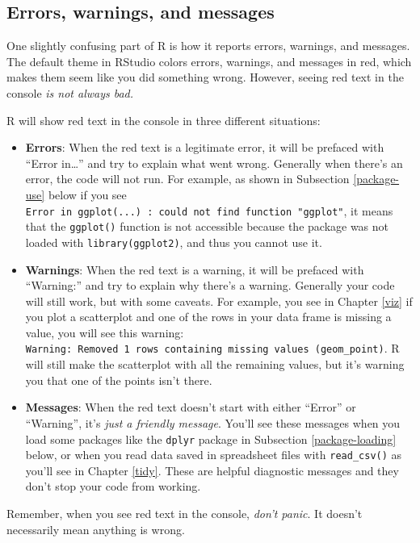 \documentclass[12pt, krantz2,]{krantz}
\providecommand{\tightlist}{%
  \setlength{\itemsep}{0pt}\setlength{\parskip}{0pt}}
\begin{document}
\hypertarget{errors-warnings-and-messages}{%
\subsection{Errors, warnings, and messages}\label{errors-warnings-and-messages}}

One slightly confusing part of R is how it reports errors, warnings, and messages. The default theme in RStudio colors errors, warnings, and messages in red, which makes them seem like you did something wrong. However, seeing red text in the console \emph{is not always bad.}

R will show red text in the console in three different situations:

\begin{itemize}
\tightlist
\item
  \textbf{Errors}: When the red text is a legitimate error, it will be prefaced with ``Error in\ldots{}'' and try to explain what went wrong. Generally when there's an error, the code will not run. For example, as shown in Subsection \ref{package-use} below if you see \texttt{Error\ in\ ggplot(...)\ :\ could\ not\ find\ function\ "ggplot"}, it means that the \texttt{ggplot()} function is not accessible because the package was not loaded with \texttt{library(ggplot2)}, and thus you cannot use it.
\item
  \textbf{Warnings}: When the red text is a warning, it will be prefaced with ``Warning:'' and try to explain why there's a warning. Generally your code will still work, but with some caveats. For example, you see in Chapter \ref{viz} if you plot a scatterplot and one of the rows in your data frame is missing a value, you will see this warning: \texttt{Warning:\ Removed\ 1\ rows\ containing\ missing\ values\ (geom\_point)}. R will still make the scatterplot with all the remaining values, but it's warning you that one of the points isn't there.
\item
  \textbf{Messages}: When the red text doesn't start with either ``Error'' or ``Warning'', it's \emph{just a friendly message}. You'll see these messages when you load some packages like the \texttt{dplyr} package in Subsection \ref{package-loading} below, or when you read data saved in spreadsheet files with \texttt{read\_csv()} as you'll see in Chapter \ref{tidy}. These are helpful diagnostic messages and they don't stop your code from working.
\end{itemize}

Remember, when you see red text in the console, \emph{don't panic}. It doesn't necessarily mean anything is wrong.
\end{document}

